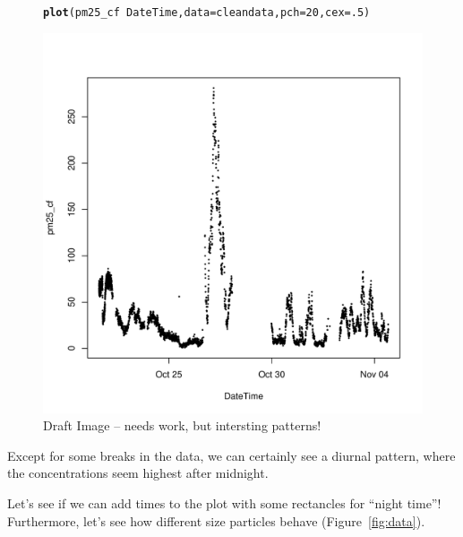 \documentclass{article}\usepackage[]{graphicx}\usepackage[]{color}
\makeatletter
\def\maxwidth{ %
  \ifdim\Gin@nat@width>\linewidth
    \linewidth
  \else
    \Gin@nat@width
  \fi
}
\newcommand{\hlnum}[1]{\textcolor[rgb]{0.686,0.059,0.569}{#1}}%
\newcommand{\hlopt}[1]{\textcolor[rgb]{0,0,0}{#1}}%
\newcommand{\hlstd}[1]{\textcolor[rgb]{0.345,0.345,0.345}{#1}}%
\newcommand{\hlkwc}[1]{\textcolor[rgb]{0.333,0.667,0.333}{#1}}%
\newcommand{\hlkwd}[1]{\textcolor[rgb]{0.737,0.353,0.396}{\textbf{#1}}}%
\newenvironment{kframe}{%
 \def\at@end@of@kframe{}%
 \ifinner\ifhmode%
  \def\at@end@of@kframe{\end{minipage}}%
  \begin{minipage}{\columnwidth}%
 \fi\fi%
 \def\FrameCommand##1{\hskip\@totalleftmargin \hskip-\fboxsep
 \colorbox{shadecolor}{##1}\hskip-\fboxsep
     \hskip-\linewidth \hskip-\@totalleftmargin \hskip\columnwidth}%
 \MakeFramed {\advance\hsize-\width
   \@totalleftmargin\z@ \linewidth\hsize
   \@setminipage}}%
 {\par\unskip\endMakeFramed%
 \at@end@of@kframe}
\newenvironment{knitrout}{}{} %
\def\maxwidth{ %
  \ifdim\Gin@nat@width>\linewidth
    \linewidth
  \else
    \Gin@nat@width
  \fi
}
\makeatother
\begin{document}
\begin{figure}
\begin{knitrout}
\color{fgcolor}\begin{kframe}
\begin{alltt}
\hlkwd{plot}\hlstd{(pm25_cf}\hlopt{~}\hlstd{DateTime,} \hlkwc{data}\hlstd{=cleandata,} \hlkwc{pch}\hlstd{=}\hlnum{20}\hlstd{,} \hlkwc{cex}\hlstd{=}\hlnum{.5}\hlstd{)}
\end{alltt}
\end{kframe}
\includegraphics[width=\maxwidth]{figure/unnamed-chunk-4-1} 

\end{knitrout}
\caption{Draft Image -- needs work, but intersting patterns!}
\label{fig:draft}
\end{figure}
Except for some breaks in the data, we can certainly see a diurnal pattern, where the concentrations seem highest after midnight. 

Let's see if we can add times to the plot with some rectancles for ``night time''!  Furthermore, let's see how different size particles behave (Figure~\ref{fig:data}). 
\end{document}
